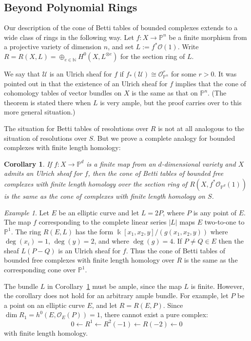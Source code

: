 \documentclass[12pt]{amsart}
\newtheorem{cor}[lemma]{Corollary}
\theoremstyle{definition}
\theoremstyle{remark}
\newtheorem{example}[lemma]{Example}
\newcommand{\kk}{\Bbbk}
\newcommand{\PP}{\mathbb{P}}
\newcommand{\cO}{\mathcal{O}}
\newcommand{\cU}{\mathcal{U}}
\newcommand{\defi}[1]{\textsf{#1}} %
\renewcommand{\P}{{\mathbb P}}
\begin{document}
\subsection*{Beyond Polynomial Rings}
Our description of the cone of Betti tables of bounded complexes
extends to a wide class of rings in the following way. Let $f\colon X\to \PP^{n}$ be a finite
morphism from a projective variety of dimension $n$, and set $L:=f^*\cO(1)$. 
Write $R=R(X,L)=\oplus_{e\in \mathbb N} H^0(X,L^{\otimes e})$ for the \defi{section ring}
of $L$.

We say that $\cU$ is an \defi{Ulrich sheaf} for $f$ if $f_*(\cU)\cong \cO_{\PP^n}^r$ for some $r>0$.  It was pointed out in \cite[Theorem~5]{eis-schrey-abel} that the existence of an Ulrich sheaf for $f$ implies that  the cone of cohomology tables of vector bundles on $X$ is the same as that on $\PP^{n}$. (The theorem is stated there when $L$ is very ample, but the proof
carries over to this more general situation.) 

The situation for Betti tables of resolutions over $R$ is not at all analogous to the situation of resolutions over $S$. But we prove a complete analogy for bounded complexes with finite length homology:

\begin{cor}\label{cor:isom cones}
If $f\colon X\to \P^{d}$ is a  finite map from an $d$-dimensional variety and $X$ admits an Ulrich sheaf for $f$, then the cone of Betti tables
of bounded free complexes with finite length homology over  the section ring
of $R(X,f^*\cO_{\PP^d}(1))$ is the same
as the cone of complexes with finite length homology on $S$. 
\end{cor}

\begin{example}\label{ex:elliptic}
Let $E$ be an elliptic curve and let $L=2P$, where $P$ is any point of $E$.  The map $f$ corresponding to the complete
linear series $|L|$ maps $E$ two-to-one to $\P^{1}$. The ring $R(E,L)$ has the form
$\kk[x_1,x_2,y]/(g(x_{1},x_{2},y))$  where $\deg(x_i)=1$, $\deg(y)=2$, and where $\deg(g)=4$.
If $P\neq Q\in E$ then the sheaf $L(P-Q)$ is an Ulrich sheaf for $f$. Thus the cone of
Betti tables of bounded free complexes with finite length homology over $R$ is the same
as the corresponding cone over $\P^{1}$.
\end{example}


The bundle $L$ in Corollary~\ref{cor:isom cones} must be ample, since the map $L$ is finite.  However, the corollary does not hold for an arbitrary ample bundle.  For example, let $P$ be a point on an elliptic curve $E$, and let $R=R(E,P)$.  Since $\dim R_1=h^0(E,\cO_E(P))=1$, there cannot exist a pure complex:
\[
0\gets R^1\gets R^2(-1)\gets R(-2)\gets 0
\]
with finite length homology.
\end{document}
